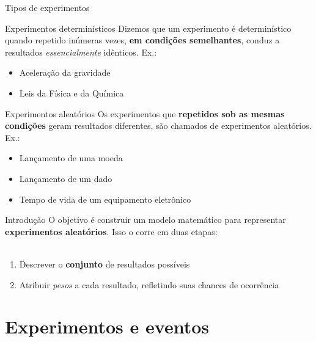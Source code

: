 \documentclass[10pt]{beamer}\usepackage[]{graphicx}\usepackage[]{color}
\theoremstyle{definition}
\begin{document}
\begin{frame}{Tipos de experimentos}
  \begin{block}{Experimentos determinísticos}
    Dizemos que um experimento é determinístico quando repetido inúmeras
    vezes, \textbf{em condições semelhantes}, conduz a resultados
    \textit{essencialmente} idênticos. Ex.:
    \begin{itemize}
    \item Aceleração da gravidade
    \item Leis da Física e da Química
    \end{itemize}
  \end{block}
  \begin{block}{Experimentos aleatórios}
    Os experimentos que \textbf{repetidos sob as mesmas condições} geram
    resultados diferentes, são chamados de experimentos aleatórios. Ex.:
    \begin{itemize}
    \item Lançamento de uma moeda
    \item Lançamento de um dado
    \item Tempo de vida de um equipamento eletrônico
    \end{itemize}
  \end{block}
\end{frame}

\begin{frame}{Introdução}
  O objetivo é construir um modelo matemático para representar
  \textbf{experimentos aleatórios}. Isso o corre em duas etapas: \\~\\
  \begin{enumerate}
  \item Descrever o \textbf{conjunto} de resultados possíveis
  \item Atribuir \textit{pesos} a cada resultado, refletindo suas
    chances de ocorrência
  \end{enumerate}
\end{frame}


\section{Experimentos e eventos}
\end{document}
